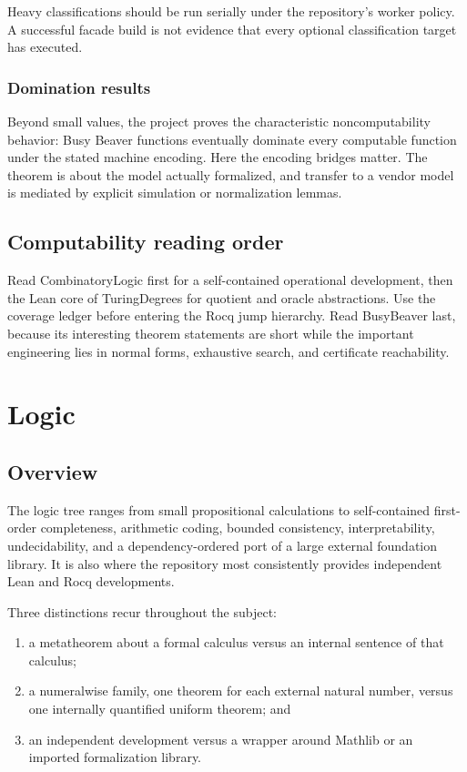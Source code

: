 \documentclass[
  10pt,
  a4paper,
  twoside,
  open=any,
  parskip=half,
  headings=big
]{scrreprt}
\newcommand{\project}[1]{\textsf{#1}}
\begin{document}
Heavy classifications should be run serially under the repository's worker policy. A successful facade build is not evidence that every optional classification target has executed.

\subsection{Domination results}

Beyond small values, the project proves the characteristic noncomputability behavior: Busy Beaver functions eventually dominate every computable function under the stated machine encoding. Here the encoding bridges matter. The theorem is about the model actually formalized, and transfer to a vendor model is mediated by explicit simulation or normalization lemmas.

\section{Computability reading order}

Read \project{CombinatoryLogic} first for a self-contained operational development, then the Lean core of \project{TuringDegrees} for quotient and oracle abstractions. Use the coverage ledger before entering the Rocq jump hierarchy. Read \project{BusyBeaver} last, because its interesting theorem statements are short while the important engineering lies in normal forms, exhaustive search, and certificate reachability.

\chapter{Logic}
\label{ch:logic}

\section{Overview}

The logic tree ranges from small propositional calculations to self-contained first-order completeness, arithmetic coding, bounded consistency, interpretability, undecidability, and a dependency-ordered port of a large external foundation library. It is also where the repository most consistently provides independent Lean and Rocq developments.

Three distinctions recur throughout the subject:

\begin{enumerate}
  \item a metatheorem about a formal calculus versus an internal sentence of that calculus;
  \item a numeralwise family, one theorem for each external natural number, versus one internally quantified uniform theorem; and
  \item an independent development versus a wrapper around Mathlib or an imported formalization library.
\end{enumerate}
\end{document}
